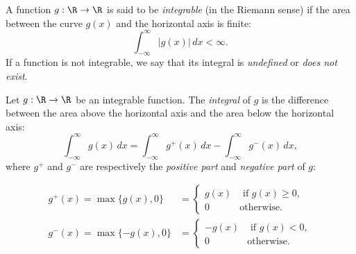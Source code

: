 A function $g:\R\to\R$ is said to be \emph{integrable} (in the Riemann sense) if the area between the curve $g(x)$ and the horizontal axis is finite:
\[
\int_{-\infty}^{\infty} |g(x)|\,dx < \infty.
\]
If a function is not integrable, we say that its integral is \emph{undefined} or \emph{does not exist}.

\bigskip
Let $g:\R\to\R$ be an integrable function. The \emph{integral} of $g$ is the difference between the area above the horizontal axis and the area below the horizontal axis:
\[
\int_{-\infty}^{\infty} g(x)\,dx = \int_{-\infty}^{\infty} g^{+}(x)\,dx  - \int_{-\infty}^{\infty} g^{-}(x)\,dx,
\]
where $g^{+}$ and $g^{-}$ are respectively the \emph{positive part} and \emph{negative part} of $g$: 

\begin{align*}
g^{+}(x)	= \max\{ g(x),0\} & = \begin{cases}  g(x) & \text{ if } g(x)\geq 0, \\ 0 & \text{otherwise.}\end{cases} \\
g^{-}(x)	= \max\{-g(x),0\} & = \begin{cases} -g(x) & \text{ if } g(x)<0, \\ 0 & \text{otherwise.}\end{cases}
\end{align*}

